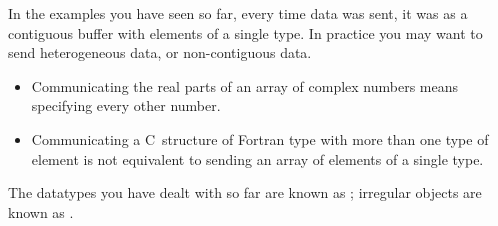 

In the examples you have seen so far, every time data was sent,
it was as a contiguous buffer with elements of a single type.
In practice you may want to send heterogeneous data, or
non-contiguous data.
\begin{itemize}
\item Communicating the real parts of an array of complex numbers
  means specifying every other number.
\item Communicating a C~structure of Fortran type with more than one
  type of element is not equivalent to sending an array of elements of
  a single type.
\end{itemize}
The datatypes you have dealt with so far are known as
; irregular objects
are known as .








